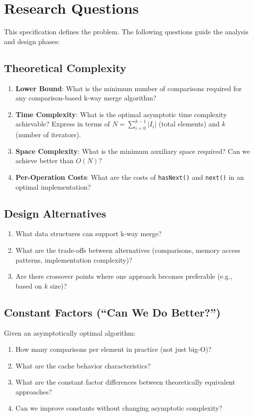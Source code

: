 \documentclass[11pt]{article}
\begin{document}
\section{Research Questions}

This specification defines the problem. The following questions guide the analysis and design phases:

\subsection{Theoretical Complexity}

\begin{enumerate}
    \item \textbf{Lower Bound}: What is the minimum number of comparisons required for any comparison-based k-way merge algorithm?
    \item \textbf{Time Complexity}: What is the optimal asymptotic time complexity achievable? Express in terms of $N = \sum_{i=0}^{k-1} |I_i|$ (total elements) and $k$ (number of iterators).
    \item \textbf{Space Complexity}: What is the minimum auxiliary space required? Can we achieve better than $O(N)$?
    \item \textbf{Per-Operation Costs}: What are the costs of \texttt{hasNext()} and \texttt{next()} in an optimal implementation?
\end{enumerate}

\subsection{Design Alternatives}

\begin{enumerate}
    \item What data structures can support k-way merge?
    \item What are the trade-offs between alternatives (comparisons, memory access patterns, implementation complexity)?
    \item Are there crossover points where one approach becomes preferable (e.g., based on $k$ size)?
\end{enumerate}

\subsection{Constant Factors (``Can We Do Better?'')}

Given an asymptotically optimal algorithm:
\begin{enumerate}
    \item How many comparisons per element in practice (not just big-O)?
    \item What are the cache behavior characteristics?
    \item What are the constant factor differences between theoretically equivalent approaches?
    \item Can we improve constants without changing asymptotic complexity?
\end{enumerate}
\end{document}
